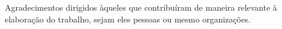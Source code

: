 
\begin{agradecimentos}
  Agradecimentos dirigidos àqueles que contribuíram de maneira relevante à elaboração do trabalho, sejam eles pessoas ou mesmo organizações.
\end{agradecimentos}
